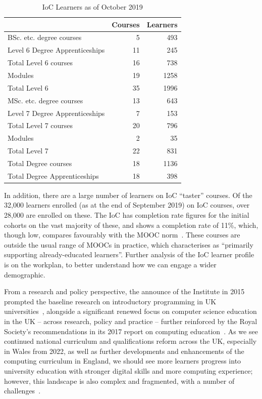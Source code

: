 \documentclass[conference]{IEEEtran}
\begin{document}
\begin{table}
  \begin{center}
\caption{IoC Learners as of October 2019\label{tab:data}}
\begin{tabular}{lrr}
  &Courses&Learners\\
    \hline
	BSc. etc. degree courses&5&493\\
	Level 6 Degree Apprenticeships&11&245\\
	Total Level 6 courses&16&738\\
	Modules&19&1258\\
	Total Level 6&35&1996\\\hline
	MSc. etc. degree courses&13&643\\
	Level 7 Degree Apprenticeships&7&153\\
	Total Level 7 courses&20&796\\
	Modules&2&35\\
	Total Level 7&22&831\\\hline
Total Degree courses&18&1136\\
  Total Degree Apprenticeships&18&398\\
                                       \hline
\end{tabular}
\end{center}
\end{table}

In addition, there are a large number of learners on IoC ``taster''
courses. Of the 32,000 learners enrolled (as at the end of September
2019) on IoC courses, over 28,000 are enrolled on these.  The IoC has
completion rate figures for the initial cohorts on the vast majority
of these, and shows a completion rate of 11\%, which, though low,
compares favourably with the MOOC
norm~\cite{ReichRuiperezValiente2019a}. These courses are outside the
usual range of MOOCs in practice, which
\cite{ReichRuiperezValiente2019a} characterises as ``primarily
supporting already-educated learners''.  Further analysis of the IoC
learner profile is on the workplan, to better understand how we can
engage a wider demographic.

From a research and policy perspective, the announce of the Institute
in 2015~\cite{HMG2015a} prompted the baseline research on introductory
programming in UK
universities~\cite{murphy-et-al:programming2017,simon-et-al:sigcse2018},
alongside a significant renewed focus on computer science education in
the UK -- across research, policy and practice -- further reinforced
by the Royal Society's recommendations in its 2017 report on computing
education~\cite{rs:2017}. As we see continued national curriculum and
qualifications reform across the UK, especially in Wales from 2022, as
well as further developments and enhancements of the computing
curriculum in England, we should see more learners progress into
university education with stronger digital skills and more computing
experience; however, this landscape is also complex and fragmented,
with a number of challenges~\cite{roehampton:2018}.
\end{document}
